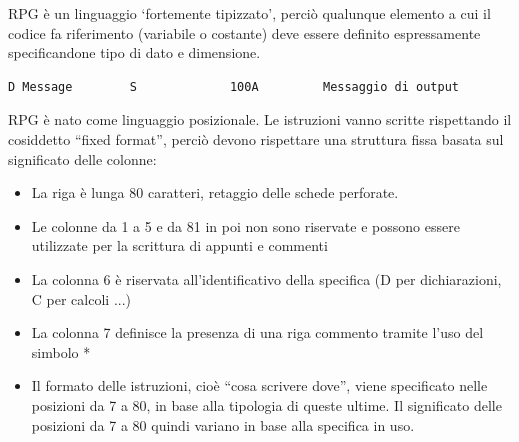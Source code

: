 \documentclass[target=bach,aauheader=,style=]{thud}
\begin{document}
RPG è un linguaggio ‘fortemente tipizzato’, perciò qualunque
elemento a cui il codice fa riferimento (variabile o costante)
deve essere definito espressamente specificandone tipo di
dato e dimensione.
\begin{lstlisting}[language=RPG, caption=Dichiarazione di una variabile alfanumerica di lunghezza 100, label=lst:rpgdeclaration]
    D Message        S             100A         Messaggio di output
\end{lstlisting}


RPG è nato come linguaggio posizionale. Le istruzioni vanno scritte rispettando il cosiddetto “fixed format”, perciò devono rispettare una struttura fissa basata sul significato delle colonne:
\begin{itemize}
    \setlength{\itemsep}{0pt} %
    \item La riga è lunga 80 caratteri, retaggio delle schede perforate.
    \item Le colonne da 1 a 5 e da 81 in poi non sono riservate e possono essere utilizzate per la scrittura di appunti e commenti
    \item La colonna 6 è riservata all’identificativo della specifica (D per dichiarazioni, C per calcoli ...)
    \item La colonna 7 definisce la presenza di una riga commento tramite l'uso del simbolo *
    \item Il formato delle istruzioni, cioè “cosa scrivere dove”, viene specificato nelle posizioni da 7 a 80,  in base alla tipologia di queste ultime. Il significato delle posizioni da 7 a 80 quindi variano in base alla specifica in uso.
\end{itemize}
\end{document}
